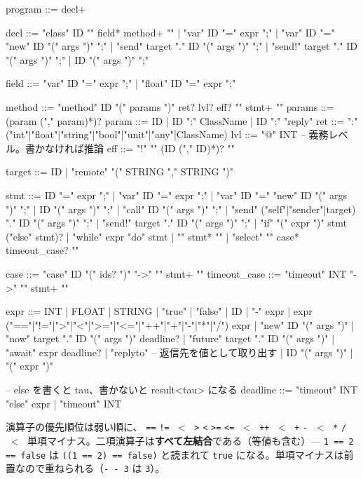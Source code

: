 \documentclass[11pt,a4paper]{ltjsarticle}
\begin{document}
\begin{term}
program    ::= decl+

decl       ::= "class" ID "{" field* method+ "}"
             | "var" ID "=" expr ";"
             | "var" ID "=" "new" ID "(" args ")" ";"
             | "send"  target "." ID "(" args ")" ";"
             | "send!" target "." ID "(" args ")" ";"
             | ID "(" args ")" ";"

field      ::= "var"   ID "=" expr ";"
             | "float" ID "=" expr ";"

method     ::= "method" ID "(" params ")" ret? lvl? eff? "{" stmt+ "}"
params     ::= (param ("," param)*)?
param      ::= ID | ID ":" ClassName | ID ":" "reply"
ret        ::= ":" ("int"|"float"|"string"|"bool"|"unit"|"any"|ClassName)
lvl        ::= "@" INT                    -- 義務レベル。書かなければ推論
eff        ::= "!" "{" (ID ("," ID)*)? "}"

target     ::= ID
             | "remote" "(" STRING "," STRING ")"

stmt       ::= ID "=" expr ";"
             | "var" ID "=" expr ";"
             | "var" ID "=" "new" ID "(" args ")" ";"
             | ID "(" args ")" ";"
             | "call" ID "(" args ")" ";"
             | "send"  ("self"|"sender"|target) "." ID "(" args ")" ";"
             | "send!" target "." ID "(" args ")" ";"
             | "if" "(" expr ")" stmt ("else" stmt)?
             | "while" expr "do" stmt
             | "{" stmt* "}"
             | "select" "{" case* timeout_case? "}"

case         ::= "case" ID "(" ids? ")" "->" "{" stmt+ "}"
timeout_case ::= "timeout" INT "->" "{" stmt+ "}"

expr       ::= INT | FLOAT | STRING | "true" | "false" | ID
             | "-" expr
             | expr ("=="|"!="|">"|"<"|">="|"<="|"++"|"+"|"-"|"*"|"/") expr
             | "new" ID "(" args ")"
             | "now" target "." ID "(" args ")" deadline?
             | "future" target "." ID "(" args ")"
             | "await" expr deadline?
             | "replyto"                  -- 返信先を値として取り出す
             | ID "(" args ")"
             | "(" expr ")"

-- else を書くと tau、書かないと result<tau> になる
deadline   ::= "timeout" INT "else" expr
             | "timeout" INT
\end{term}

演算子の優先順位は弱い順に、
\texttt{==} \texttt{!=} $\;<\;$
\texttt{>} \texttt{<} \texttt{>=} \texttt{<=} $\;<\;$
\texttt{++} $\;<\;$
\texttt{+} \texttt{-} $\;<\;$
\texttt{*} \texttt{/} $\;<\;$ 単項マイナス。二項演算子は\textbf{すべて左結合}である（等値も含む）--- \texttt{1 == 2 == false} は \texttt{((1 == 2) == false)} と読まれて \texttt{true} になる。単項マイナスは前置なので重ねられる（\texttt{- - 3} は \texttt{3}）。
\end{document}
